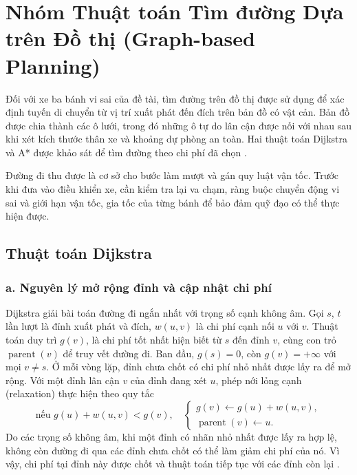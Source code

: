 \documentclass[12pt,a4paper,oneside]{report}
\begin{document}
\section{Nhóm Thuật toán Tìm đường Dựa trên Đồ thị (Graph-based Planning)}

Đối với xe ba bánh vi sai của đề tài, tìm đường trên đồ thị được sử dụng để xác định tuyến di chuyển từ vị trí xuất phát đến đích trên bản đồ có vật cản. Bản đồ được chia thành các ô lưới, trong đó những ô tự do lân cận được nối với nhau sau khi xét kích thước thân xe và khoảng dự phòng an toàn. Hai thuật toán Dijkstra và A* được khảo sát để tìm đường theo chi phí đã chọn \cite[Chương 2]{lavalle-planning-2006}.

Đường đi thu được là cơ sở cho bước làm mượt và gán quy luật vận tốc. Trước khi đưa vào điều khiển xe, cần kiểm tra lại va chạm, ràng buộc chuyển động vi sai và giới hạn vận tốc, gia tốc của từng bánh để bảo đảm quỹ đạo có thể thực hiện được.

\subsection{Thuật toán Dijkstra}

\subsubsection*{a. Nguyên lý mở rộng đỉnh và cập nhật chi phí}

Dijkstra giải bài toán đường đi ngắn nhất với trọng số cạnh không âm. Gọi \(s\), \(t\) lần lượt là đỉnh xuất phát và đích, \(w(u,v)\) là chi phí cạnh nối \(u\) với \(v\). Thuật toán duy trì \(g(v)\), là chi phí tốt nhất hiện biết từ \(s\) đến đỉnh \(v\), cùng con trỏ \(\operatorname{parent}(v)\) để truy vết đường đi. Ban đầu, \(g(s)=0\), còn \(g(v)=+\infty\) với mọi \(v\neq s\). Ở mỗi vòng lặp, đỉnh chưa chốt có chi phí nhỏ nhất được lấy ra để mở rộng. Với một đỉnh lân cận \(v\) của đỉnh đang xét \(u\), phép nới lỏng cạnh (relaxation) thực hiện theo quy tắc
\begin{equation}
  \text{nếu } g(u)+w(u,v)<g(v),\quad
  \begin{cases}
    g(v)\leftarrow g(u)+w(u,v),\\
    \operatorname{parent}(v)\leftarrow u.
  \end{cases}
  \label{eq:dijkstra-relax}
\end{equation}
Do các trọng số không âm, khi một đỉnh có nhãn nhỏ nhất được lấy ra hợp lệ, không còn đường đi qua các đỉnh chưa chốt có thể làm giảm chi phí của nó. Vì vậy, chi phí tại đỉnh này được chốt và thuật toán tiếp tục với các đỉnh còn lại \cite{lavalle-planning-2006}.
\end{document}
